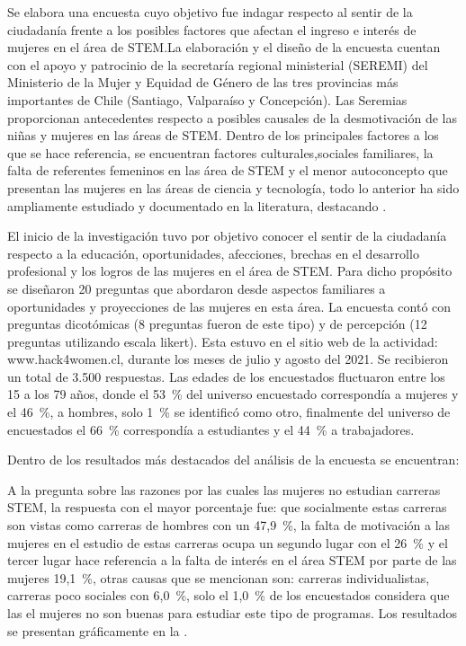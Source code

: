 \documentclass[spanish]{textolivre}
\begin{document}
 Se elabora una encuesta cuyo objetivo fue indagar respecto  al sentir de la ciudadanía frente a los posibles factores que afectan el ingreso e interés de mujeres en el área de STEM.La elaboración y el diseño de la encuesta cuentan con el apoyo y patrocinio de la secretaría regional ministerial (SEREMI) del Ministerio de la Mujer y Equidad de Género de las tres provincias más importantes de Chile (Santiago, Valparaíso y Concepción). Las Seremias proporcionan antecedentes respecto a posibles causales de la desmotivación de las niñas y mujeres en las áreas de STEM. Dentro de los principales factores a los que se hace referencia, se encuentran factores culturales,sociales familiares, la falta de referentes femeninos en las área de STEM y el menor autoconcepto que presentan las mujeres en las áreas de ciencia y tecnología, todo lo anterior ha sido ampliamente estudiado y documentado en la literatura, destacando   \cite{InstitutoNacionaldeEstadisticas2022, Futuro2020,DelasCuevas2022,Prendes-Espinosa2020,Costa2021,Garcia-Holgado2020a} .
 
El inicio de la investigación tuvo por objetivo conocer el sentir de la ciudadanía respecto a la educación, oportunidades, afecciones, brechas en el desarrollo profesional y los logros de las mujeres en el área de STEM. Para dicho propósito se diseñaron 20 preguntas que abordaron desde aspectos familiares a oportunidades y proyecciones de las mujeres en esta área. La encuesta contó con preguntas dicotómicas (8 preguntas fueron de este tipo) y de percepción (12 preguntas utilizando escala likert).
Esta estuvo en el sitio web de la actividad: www.hack4women.cl, durante los meses de julio y agosto del 2021. Se recibieron un total de 3.500 respuestas. Las edades de los encuestados fluctuaron entre los 15 a los 79 años, donde el 53~\% del universo encuestado correspondía a mujeres y el 46~\%, a hombres, solo 1~\% se identificó como otro, finalmente del universo de encuestados el 66~\% correspondía a estudiantes y el 44~\% a trabajadores.

Dentro de los resultados más destacados del análisis de la encuesta se encuentran:

A la pregunta sobre las razones por las cuales las mujeres no estudian carreras STEM, la respuesta con el mayor porcentaje fue: que socialmente estas carreras son vistas como carreras de hombres con un 47,9~\%, la falta de motivación a las mujeres en el estudio de estas carreras ocupa un segundo lugar con el 26~\% y el tercer lugar hace referencia a la falta de interés en el área STEM por parte de las mujeres 19,1~\%, otras causas que se mencionan son: carreras individualistas, carreras poco sociales con 6,0~\%, solo el 1,0~\% de los encuestados considera que las el mujeres no son buenas para estudiar este tipo de programas.  Los resultados se presentan gráficamente en la .
\end{document}
